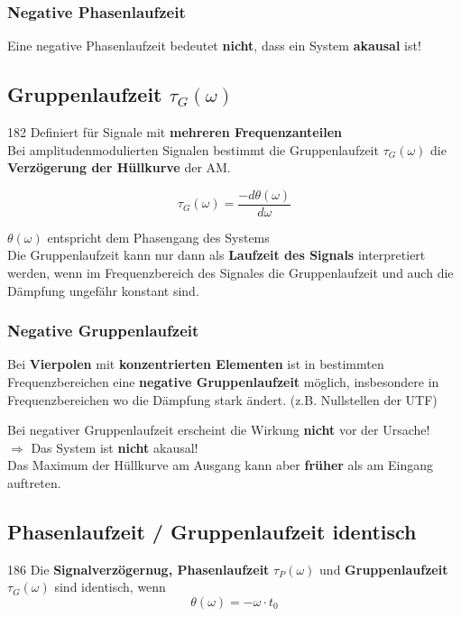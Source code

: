 \subsubsection{Negative Phasenlaufzeit}
Eine negative Phasenlaufzeit bedeutet \textbf{nicht}, dass ein System \textbf{akausal} ist!


\subsection{Gruppenlaufzeit $\tau_G(\omega)$ }{182}
Definiert für Signale mit \textbf{mehreren Frequenzanteilen} \\

Bei amplitudenmodulierten Signalen bestimmt die Gruppenlaufzeit $\tau_G(\omega)$ die \textbf{Verzögerung der Hüllkurve} der AM.

$$ \boxed{ \tau_G(\omega) = \frac{- d \theta(\omega)}{d \omega} } $$

$ \theta(\omega)$ entspricht dem Phasengang des Systems \\

Die Gruppenlaufzeit kann nur dann als \textbf{Laufzeit des Signals} interpretiert werden, wenn im Frequenzbereich des Signales 
die Gruppenlaufzeit und auch die Dämpfung ungefähr konstant sind.


\subsubsection{Negative Gruppenlaufzeit}
Bei \textbf{Vierpolen} mit \textbf{konzentrierten Elementen} ist in bestimmten Frequenzbereichen eine 
\textbf{negative Gruppenlaufzeit} möglich, insbesondere in Frequenzbereichen wo die Dämpfung stark ändert.
(z.B. Nullstellen der UTF) 

Bei negativer Gruppenlaufzeit erscheint die Wirkung \textbf{nicht} vor der Ursache! \\
$\Rightarrow$ Das System ist \textbf{nicht} akausal! \\
Das Maximum der Hüllkurve am Ausgang kann aber \textbf{früher} als am Eingang auftreten.


\subsection{Phasenlaufzeit / Gruppenlaufzeit identisch}{186}
\label{Phasenlaufzeit / Gruppenlaufzeit identisch}
Die \textbf{Signalverzögernug, Phasenlaufzeit} $\tau_P(\omega)$ und \textbf{Gruppenlaufzeit} 
$\tau_G(\omega)$ sind identisch, wenn
$$ \boxed{ \theta(\omega) = - \omega \cdot t_0  } $$

